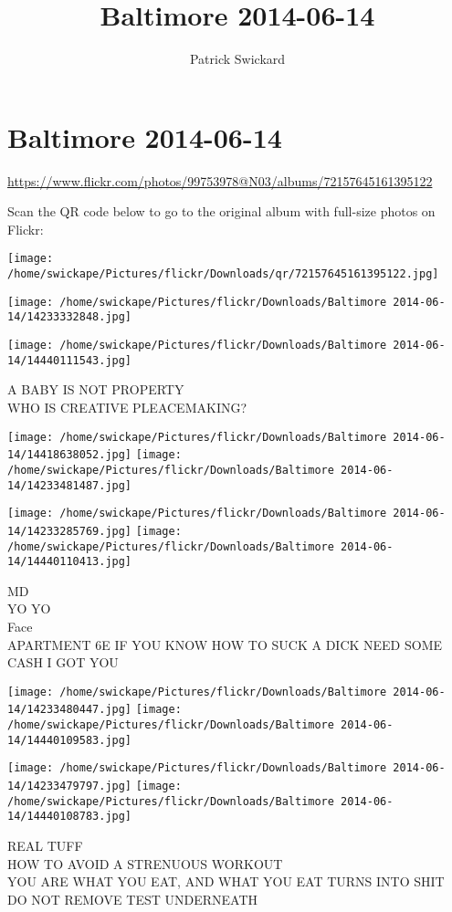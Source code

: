 \documentclass[10pt,letterpaper]{article}
\title{Baltimore 2014-06-14}
\author{Patrick Swickard}
\date{}
\begin{document}
\section*{Baltimore 2014-06-14}

\url{https://www.flickr.com/photos/99753978@N03/albums/72157645161395122}

Scan the QR code below to go to the original album with full-size photos on Flickr:

\texttt{[image: /home/swickape/Pictures/flickr/Downloads/qr/72157645161395122.jpg]}
\pagebreak

\texttt{[image: /home/swickape/Pictures/flickr/Downloads/Baltimore 2014-06-14/14233332848.jpg]}

\vspace{0.25in}
\texttt{[image: /home/swickape/Pictures/flickr/Downloads/Baltimore 2014-06-14/14440111543.jpg]}

A BABY IS NOT PROPERTY\\
WHO IS CREATIVE PLEACEMAKING?
\pagebreak

\texttt{[image: /home/swickape/Pictures/flickr/Downloads/Baltimore 2014-06-14/14418638052.jpg]}
\texttt{[image: /home/swickape/Pictures/flickr/Downloads/Baltimore 2014-06-14/14233481487.jpg]}

\texttt{[image: /home/swickape/Pictures/flickr/Downloads/Baltimore 2014-06-14/14233285769.jpg]}
\texttt{[image: /home/swickape/Pictures/flickr/Downloads/Baltimore 2014-06-14/14440110413.jpg]}

MD\\
YO YO\\
Face\\
APARTMENT 6E IF YOU KNOW HOW TO SUCK A DICK NEED SOME CASH I GOT YOU
\pagebreak

\texttt{[image: /home/swickape/Pictures/flickr/Downloads/Baltimore 2014-06-14/14233480447.jpg]}
\texttt{[image: /home/swickape/Pictures/flickr/Downloads/Baltimore 2014-06-14/14440109583.jpg]}

\texttt{[image: /home/swickape/Pictures/flickr/Downloads/Baltimore 2014-06-14/14233479797.jpg]}
\texttt{[image: /home/swickape/Pictures/flickr/Downloads/Baltimore 2014-06-14/14440108783.jpg]}

REAL TUFF\\
HOW TO AVOID A STRENUOUS WORKOUT\\
YOU ARE WHAT YOU EAT, AND WHAT YOU EAT TURNS INTO SHIT\\
DO NOT REMOVE TEST UNDERNEATH
\pagebreak
\end{document}
